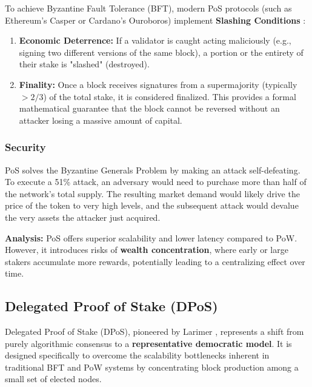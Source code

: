 To achieve Byzantine Fault Tolerance (BFT), modern PoS protocols (such as Ethereum's Casper or Cardano's Ouroboros) implement \textbf{Slashing Conditions} \cite{buterin2014ethereum}:
\begin{enumerate}
    \item \textbf{Economic Deterrence:} If a validator is caught acting maliciously (e.g., signing two different versions of the same block), a portion or the entirety of their stake is "slashed" (destroyed).
    \item \textbf{Finality:} Once a block receives signatures from a supermajority (typically $>2/3$) of the total stake, it is considered finalized. This provides a formal mathematical guarantee that the block cannot be reversed without an attacker losing a massive amount of capital.
\end{enumerate}

\subsubsection{Security }
PoS solves the Byzantine Generals Problem by making an attack self-defeating. To execute a 51\% attack, an adversary would need to purchase more than half of the network's total supply. The resulting market demand would likely drive the price of the token to very high levels, and the subsequent attack would devalue the very assets the attacker just acquired.

\textbf{Analysis:} 
PoS offers superior scalability and lower latency compared to PoW. However, it introduces risks of \textbf{wealth concentration}, where early or large stakers accumulate more rewards, potentially leading to a centralizing effect over time.

\subsection{Delegated Proof of Stake (DPoS)}
Delegated Proof of Stake (DPoS), pioneered by Larimer \cite{larimer2014dpos}, represents a shift from purely algorithmic consensus to a \textbf{representative democratic model}. It is designed specifically to overcome the scalability bottlenecks inherent in traditional BFT and PoW systems by concentrating block production among a small set of elected nodes.

